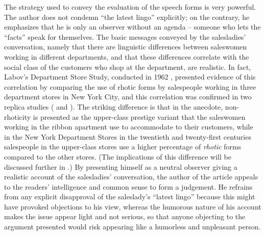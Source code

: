 The strategy used to convey the evaluation of the speech forms is very powerful. The author does not condemn “the latest lingo” explicitly; on the contrary, he emphasizes that he is only an observer without an agenda – someone who lets the “facts” speak for themselves. The basic messages conveyed by the salesladies’ conversation, namely that there are linguistic differences between saleswomen working in different departments, and that these differences correlate with the social class of the customers who shop at the department, are realistic. In fact, Labov’s Department Store Study, conducted in 1962 \citep{Labov2006}, presented evidence of this correlation by comparing the use of rhotic forms by salespeople working in three department stores in New York City, and this correlation was confirmed in two replica studies (\citealt{Fowler1986} and \citealt{Mather2012}). The striking difference is that in the anecdote, non-rhoticity is presented as the upper-class prestige variant that the saleswomen working in the ribbon apartment use to accommodate to their customers, while in the New York Department Stores in the twentieth and twenty-first centuries salespeople in the upper-class stores use a higher percentage of \emph{rhotic} forms compared to the other stores. (The implications of this difference will be discussed further in .) By presenting himself as a neutral observer giving a realistic account of the salesladies’ conversation, the author of the article appeals to the readers’ intelligence and common sense to form a judgement. He refrains from any explicit disapproval of the saleslady’s “latest lingo” because this might have provoked objections to his view, whereas the humorous nature of his account makes the issue appear light and not serious, so that anyone objecting to the argument presented would risk appearing like a humorless and unpleasant person.

